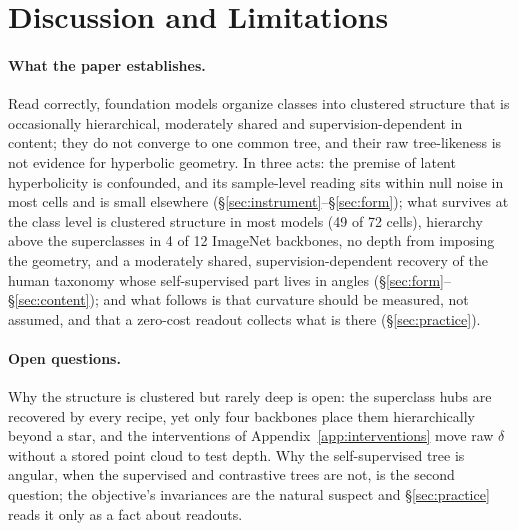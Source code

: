 \section{Discussion and Limitations}
\label{sec:discussion}

\paragraph{What the paper establishes.} Read correctly, foundation models organize classes into clustered structure that is occasionally hierarchical, moderately shared and supervision-dependent in content; they do not converge to one common tree, and their raw tree-likeness is not evidence for hyperbolic geometry. In three acts: the premise of latent hyperbolicity is confounded, and its sample-level reading sits within null noise in most cells and is small elsewhere (\S\ref{sec:instrument}--\S\ref{sec:form}); what survives at the class level is clustered structure in most models (49 of 72 cells), hierarchy above the superclasses in 4 of 12 ImageNet backbones, no depth from imposing the geometry, and a moderately shared, supervision-dependent recovery of the human taxonomy whose self-supervised part lives in angles (\S\ref{sec:form}--\S\ref{sec:content}); and what follows is that curvature should be measured, not assumed, and that a zero-cost readout collects what is there (\S\ref{sec:practice}).

\paragraph{Open questions.} Why the structure is clustered but rarely deep is open: the superclass hubs are recovered by every recipe, yet only four backbones place them hierarchically beyond a star, and the interventions of Appendix~\ref{app:interventions} move raw $\delta$ without a stored point cloud to test depth. Why the self-supervised tree is angular, when the supervised and contrastive trees are not, is the second question; the objective's invariances are the natural suspect and \S\ref{sec:practice} reads it only as a fact about readouts.

